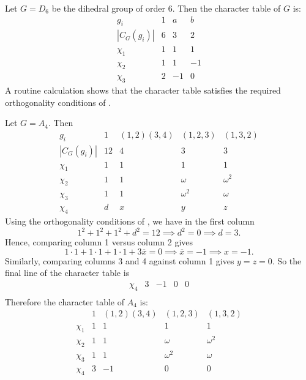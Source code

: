 \documentclass[11pt, notitlepage]{article}
\numberwithin{equation}{section}
\theoremstyle{plain}
\theoremstyle{definition}
\newenvironment{example}
	{\pushQED{\qed}\renewcommand{\qedsymbol}{$\blacktriangleleft$}\examplex}
	{\popQED\endexamplex}
\begin{document}
\begin{example}
Let $G = D_6$ be the dihedral group of order 6. Then the character table of $G$ is:
\[
    \begin{array}{c|rrr}
        g_i        & 1 & a  & b  \\\hline
        |C_G(g_i)| & 6 & 3  & 2 \\\hline
        \chi_1     & 1 & 1  & 1 \\
        \chi_2     & 1 & 1  & -1\\
        \chi_3     & 2 & -1 & 0
    \end{array}
\]
A routine calculation shows that the character table satisfies the required orthogonality conditions of .
\end{example}

\begin{example}
Let $G = A_4$. Then
\[
    \begin{array}{c|cccc}
        g_i        & 1  & (1,2)(3,4) & (1,2,3)  & (1,3,2)  \\\hline
        |C_G(g_i)| & 12 &      4     &    3     &    3\\\hline
        \chi_1     & 1  &      1     &    1     &    1\\
        \chi_2     & 1  &      1     &  \omega  &  \omega^2\\
        \chi_3     & 1  &      1     & \omega^2 &  \omega\\
        \chi_4     & d  &      x     &    y    &    z
    \end{array}
\]
Using the orthogonality conditions of , we have in the first column
\[
    1^2 + 1^2 + 1^2 + d^2 = 12 \implies d^2 = 0 \implies d = 3.
\]
Hence, comparing column 1 versus column 2 gives
\[
    1 \cdot 1 + 1 \cdot 1 + 1 \cdot 1 + 3\overline x = 0 \implies \overline x = -1 \implies x = -1.
\]
Similarly, comparing columns 3 and 4 against column 1 gives $y = z = 0$. So the final line of the character table is
\[
    \begin{array}{c|clcc}
        \chi_4 & 3 & -1 & 0 & 0  \\
    \end{array}
\]
Therefore the character table of $A_4$ is:
\[
    \begin{array}{c|cccc}
                   & 1  & (1,2)(3,4) & (1,2,3)  & (1,3,2)  \\\hline
        \chi_1     & 1  &      1     &    1     &    1\\
        \chi_2     & 1  &      1     &  \omega  &  \omega^2\\
        \chi_3     & 1  &      1     & \omega^2 &  \omega\\
        \chi_4     & 3  &     -1     &    0     &    0
    \end{array}
\]
\end{example}
\end{document}
